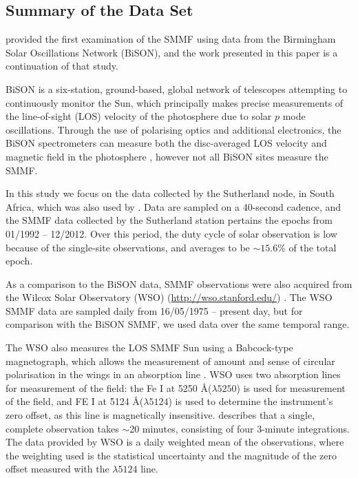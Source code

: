 \subsection{Summary of the Data Set}

\citet{chaplin_studies_2003} provided the first examination of the SMMF using data from the Birmingham Solar Oscillations Network (BiSON), and the work presented in this paper is a continuation of that study. 

BiSON is a six-station, ground-based, global network of telescopes attempting to continuously monitor the Sun, which principally makes precise measurements of the line-of-sight (LOS) velocity of the photosphere due to solar $p$ mode oscillations. Through the use of polarising optics and additional electronics, the BiSON spectrometers can measure both the disc-averaged LOS velocity and magnetic field in the photosphere \citep{chaplin_studies_2003}, however not all BiSON sites measure the SMMF. 

In this study we focus on the data collected by the Sutherland node, in South Africa, which was also used by \cite{chaplin_studies_2003}. Data are sampled on a 40-second cadence, and the SMMF data collected by the Sutherland station pertains the epochs from 01/1992 -- 12/2012. Over this period, the duty cycle of solar observation is low because of the single-site observations, and averages to be $\sim 15.6\%$ of the total epoch.

As a comparison to the BiSON data, SMMF observations were also acquired from the Wilcox Solar Observatory (WSO) (\url{http://wso.stanford.edu/}) \citep{scherrer_mean_1977-1}. The WSO SMMF data are sampled daily from 16/05/1975 -- present day, but for comparison with the BiSON SMMF, we used data over the same temporal range.

The WSO also measures the LOS SMMF Sun using a Babcock-type magnetograph, which allows the measurement of amount and sense of circular polarisation in the wings in an absorption line \citep{scherrer_mean_1977}. WSO uses two absorption lines for measurement of the field: the Fe I at 5250 \AA ($\lambda 5250$) is used for measurement of the field, and FE I at 5124 \AA ($\lambda 5124$) is used to determine the instrument's zero offset, as this line is magnetically insensitive. \cite{scherrer_mean_1977} describes that a single, complete observation takes $\sim$20 minutes, consisting of four 3-minute integrations. The data provided by WSO is a daily weighted mean of the observations, where the weighting used is the statistical uncertainty and the magnitude of the zero offset measured with the $\lambda 5124$ line.


